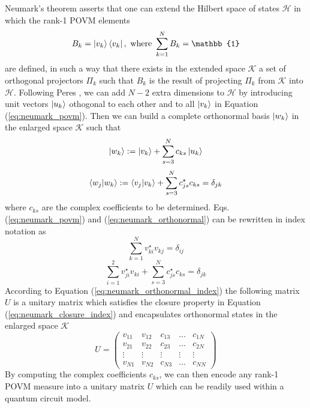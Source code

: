 Neumark's theorem \cite{neumark1940} asserts that one can extend the Hilbert space of states $\mathcal{H}$ in which the rank-1 POVM elements 
\begin{equation}\label{eq:neumark_povm}
B_k = \ket{v_{k}} \bra{v_{k}},\ \text{where}\ \sum_{k=1}^{N} B_{k} = \mathbb{1}
\end{equation}
 are defined, in such a way that there exists in the extended space $\mathcal{K}$ a set of orthogonal projectors $\Pi_{k}$ such that $B_k$
 is the result of projecting $\Pi_{k}$ from $\mathcal{K}$ into $\mathcal{H}$. Following Peres \cite{peres1995}, we can add $N-2$ extra dimensions to $\mathcal{H}$ by introducing unit vectors $\ket{u_{k}}$ othogonal to each other and to all $\ket{v_{k}}$ in Equation (\ref{eq:neumark_povm}). Then we can build a complete orthonormal basis $\ket{w_{k}}$ in the enlarged space $\mathcal{K}$ such that
\begin{equation}
\ket{w_{k}} := \ket{v_{k}} + \sum_{s=3}^{N} c_{k s} \ket{u_{k}}
\end{equation}
\begin{equation}\label{eq:neumark_orthonormal}
\bra{w_{j}} \ket{w_{k}} := \bra{v_{j}} \ket{v_{k}} + \sum_{s=3}^{N} c_{j s}^{\star} c_{k s} = \delta_{j k}
\end{equation}
where $c_{ks}$ are the complex coefficients to be determined. Eqs. (\ref{eq:neumark_povm}) and (\ref{eq:neumark_orthonormal}) can be rewritten in index notation as 
\begin{equation}\label{eq:neumark_closure_index}
\sum_{k=1}^{N}v_{k i}^{\star} v_{k j} = \delta_{ij}
\end{equation}
\begin{equation}\label{eq:neumark_orthonormal_index}
\sum_{i=1}^{2} v_{j i}^{\star} v_{k i} + \sum_{s=3}^{N} c_{j s}^{\star} c_{k s} = \delta_{j k}
\end{equation}
According to Equation (\ref{eq:neumark_orthonormal_index}) the following matrix $U$ is a unitary matrix which satisfies the closure property in Equation (\ref{eq:neumark_closure_index}) and encapsulates orthonormal states in the enlarged space $\mathcal{K}$ 
\begin{equation}
U = 
\begin{pmatrix}
v_{1 1} & v_{1 2} & c_{13} & \dots & c_{1 N} \\
v_{2 1} & v_{2 2} & c_{23} & \dots & c_{2 N} \\
\vdots & \vdots & \vdots & \vdots &  \vdots \\
v_{N1} & v_{N2} & c_{N3} & \dots & c_{NN}
\end{pmatrix}
\end{equation}
By computing the complex coefficients $c_{ks}$, we can then encode any rank-1 POVM measure into a unitary matrix $U$ which can be readily used within a quantum circuit model.